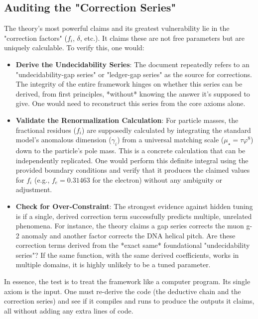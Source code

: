 \subsection{Auditing the "Correction Series"}
The theory's most powerful claims and its greatest vulnerability lie in the "correction factors" ($f_i$, $\delta$, etc.). It claims these are not free parameters but are uniquely calculable. To verify this, one would:

\begin{itemize}
    \item \textbf{Derive the Undecidability Series}: The document repeatedly refers to an "undecidability-gap series" or "ledger-gap series" as the source for corrections. The integrity of the entire framework hinges on whether this series can be derived, from first principles, *without* knowing the answer it's supposed to give. One would need to reconstruct this series from the core axioms alone.
    \item \textbf{Validate the Renormalization Calculation}: For particle masses, the fractional residues ($f_i$) are supposedly calculated by integrating the standard model's anomalous dimension ($\gamma_i$) from a universal matching scale ($\mu_\star=\tau\varphi^{8}$) down to the particle's pole mass. This is a concrete calculation that can be independently replicated. One would perform this definite integral using the provided boundary conditions and verify that it produces the claimed values for $f_i$ (e.g., $f_e = 0.31463$ for the electron) without any ambiguity or adjustment.
    \item \textbf{Check for Over-Constraint}: The strongest evidence against hidden tuning is if a single, derived correction term successfully predicts multiple, unrelated phenomena. For instance, the theory claims a gap series corrects the muon g-2 anomaly and another factor corrects the DNA helical pitch. Are these correction terms derived from the *exact same* foundational "undecidability series"? If the same function, with the same derived coefficients, works in multiple domains, it is highly unlikely to be a tuned parameter.
\end{itemize}

In essence, the test is to treat the framework like a computer program. Its single axiom is the input. One must re-derive the code (the deductive chain and the correction series) and see if it compiles and runs to produce the outputs it claims, all without adding any extra lines of code.

\appendix

